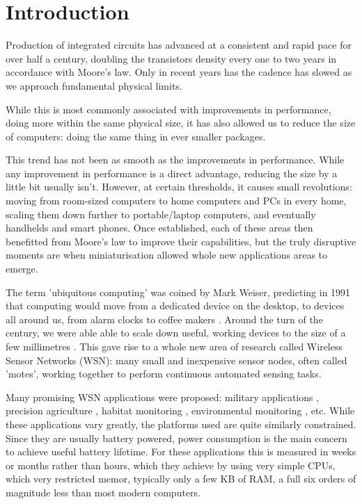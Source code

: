 \chapter{Introduction}

Production of integrated circuits has advanced at a consistent and rapid pace for over half a century, doubling the transistors density every one to two years in accordance with Moore's law. Only in recent years has the cadence has slowed as we approach fundamental physical limits.

While this is most commonly associated with improvements in performance, doing more within the same physical size, it has also allowed us to reduce the size of computers: doing the same thing in ever smaller packages.

This trend has not been as smooth as the improvements in performance. While any improvement in performance is a direct advantage, reducing the size by a little bit usually isn't. However, at certain thresholds, it causes small revolutions: moving from room-sized computers to home computers and PCs in every home,  scaling them down further to portable/laptop computers, and eventually handhelds and smart phones. Once established, each of these areas then benefitted from Moore's law to improve their capabilities, but the truly disruptive moments are when miniaturisation allowed whole new applications areas to emerge.

The term 'ubiquitous computing' was coined by Mark Weiser, predicting in 1991 that computing would move from a dedicated device on the desktop, to devices all around us, from alarm clocks to coffee makers \cite{Weiser:1991wz}. Around the turn of the century, we were able able to scale down useful, working devices to the size of a few millimetres \cite{Warneke:2001ui}. This gave rise to a whole new area of research called Wireless Sensor Networks (WSN): many small and inexpensive sensor nodes, often called 'motes', working together to perform continuous automated sensing tasks.

Many promising WSN applications were proposed: military applications \cite{Arora:2004}, precision agriculture \cite{Langendoen:2006un}, habitat monitoring \cite{Mainwaring:2002wb}, environmental monitoring \cite{WernerAllen:2006ta}, etc. While these applications vary greatly, the platforms used are quite similarly constrained. Since they are usually battery powered, power consumption is the main concern to achieve useful battery lifetime. For these applications this is measured in weeks or months rather than hours, which they achieve by using very simple CPUs, which very restricted memor, typically only a few KB of RAM, a full six orders of magnitude less than most modern computers.

